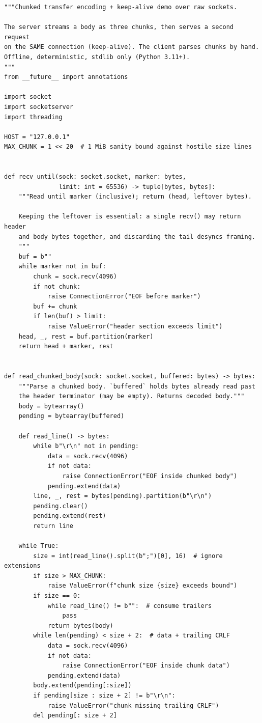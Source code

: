 \begin{verbatim}
"""Chunked transfer encoding + keep-alive demo over raw sockets.

The server streams a body as three chunks, then serves a second request
on the SAME connection (keep-alive). The client parses chunks by hand.
Offline, deterministic, stdlib only (Python 3.11+).
"""
from __future__ import annotations

import socket
import socketserver
import threading

HOST = "127.0.0.1"
MAX_CHUNK = 1 << 20  # 1 MiB sanity bound against hostile size lines


def recv_until(sock: socket.socket, marker: bytes,
               limit: int = 65536) -> tuple[bytes, bytes]:
    """Read until marker (inclusive); return (head, leftover bytes).

    Keeping the leftover is essential: a single recv() may return header
    and body bytes together, and discarding the tail desyncs framing.
    """
    buf = b""
    while marker not in buf:
        chunk = sock.recv(4096)
        if not chunk:
            raise ConnectionError("EOF before marker")
        buf += chunk
        if len(buf) > limit:
            raise ValueError("header section exceeds limit")
    head, _, rest = buf.partition(marker)
    return head + marker, rest


def read_chunked_body(sock: socket.socket, buffered: bytes) -> bytes:
    """Parse a chunked body. `buffered` holds bytes already read past
    the header terminator (may be empty). Returns decoded body."""
    body = bytearray()
    pending = bytearray(buffered)

    def read_line() -> bytes:
        while b"\r\n" not in pending:
            data = sock.recv(4096)
            if not data:
                raise ConnectionError("EOF inside chunked body")
            pending.extend(data)
        line, _, rest = bytes(pending).partition(b"\r\n")
        pending.clear()
        pending.extend(rest)
        return line

    while True:
        size = int(read_line().split(b";")[0], 16)  # ignore extensions
        if size > MAX_CHUNK:
            raise ValueError(f"chunk size {size} exceeds bound")
        if size == 0:
            while read_line() != b"":  # consume trailers
                pass
            return bytes(body)
        while len(pending) < size + 2:  # data + trailing CRLF
            data = sock.recv(4096)
            if not data:
                raise ConnectionError("EOF inside chunk data")
            pending.extend(data)
        body.extend(pending[:size])
        if pending[size : size + 2] != b"\r\n":
            raise ValueError("chunk missing trailing CRLF")
        del pending[: size + 2]



\end{verbatim}
